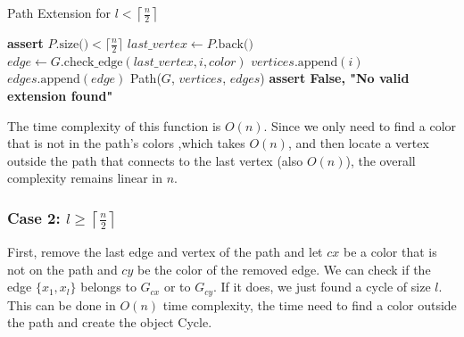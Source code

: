 \begin{algorithm}[H]
    \caption{Path Extension for \( l < \left \lceil \frac{n}{2} \right \rceil \)}
    \begin{algorithmic}[1]
        \State \textbf{assert} \( P.\text{size()} < \lceil \frac{n}{2} \rceil \)
        \State $last\_vertex \gets P.\text{back()}$
             
                     
                        \State $edge \gets G.\text{check\_edge}(last\_vertex, i, color)$
                            \State $vertices.\text{append}(i)$
                            \State $edges.\text{append}(edge)$
                            \State \Return Path($G$, $vertices$, $edges$) 
                        \EndIf
                    \EndIf
                \EndFor
            \EndIf
        \EndFor
        \State \textbf{assert False, "No valid extension found"}
    \EndFunction
    \end{algorithmic}
\end{algorithm}

The time complexity of this function is \( O(n) \). Since we 
only need to find a color that is not in the path’s colors 
,which takes \( O(n) \), and then locate a vertex outside 
the path that connects to the last vertex (also \( O(n) \)), 
the overall complexity remains linear in \( n \).

\subsubsection{Case 2: \( l \geq \left \lceil \frac{n}{2} \right \rceil \)}

First, remove the last edge and
vertex of the path and let $cx$ be a color that is not on the path and 
$cy$ be the color of the removed edge. We can check if the edge $\{x_1, x_{l}\}$ belongs to $G_{cx}$ or
to $G_{cy}$. If it does, we just found a cycle of size $l$. This can be done in $O(n)$ time complexity, the time need
to find a color outside the path and create the object Cycle. 


